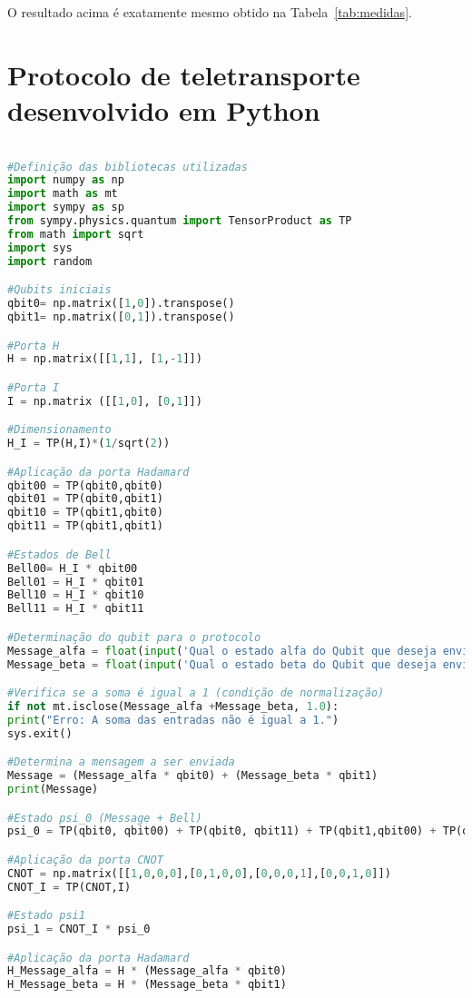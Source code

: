 O resultado acima é exatamente mesmo obtido na Tabela~\ref{tab:medidas}.

\clearpage

\chapter{Protocolo de teletransporte desenvolvido em Python}
\begin{lstlisting}[language=Python, caption=Protocolo de Teletransporte]

#Definição das bibliotecas utilizadas
import numpy as np
import math as mt
import sympy as sp
from sympy.physics.quantum import TensorProduct as TP
from math import sqrt
import sys
import random

#Qubits iniciais
qbit0= np.matrix([1,0]).transpose()
qbit1= np.matrix([0,1]).transpose()

#Porta H
H = np.matrix([[1,1], [1,-1]])

#Porta I
I = np.matrix ([[1,0], [0,1]])

#Dimensionamento
H_I = TP(H,I)*(1/sqrt(2))

#Aplicação da porta Hadamard
qbit00 = TP(qbit0,qbit0)
qbit01 = TP(qbit0,qbit1)
qbit10 = TP(qbit1,qbit0)
qbit11 = TP(qbit1,qbit1)

#Estados de Bell
Bell00= H_I * qbit00
Bell01 = H_I * qbit01
Bell10 = H_I * qbit10
Bell11 = H_I * qbit11

#Determinação do qubit para o protocolo
Message_alfa = float(input('Qual o estado alfa do Qubit que deseja enviar?'))
Message_beta = float(input('Qual o estado beta do Qubit que deseja enviar?'))

#Verifica se a soma é igual a 1 (condição de normalização)
if not mt.isclose(Message_alfa +Message_beta, 1.0):
print("Erro: A soma das entradas não é igual a 1.")
sys.exit()

#Determina a mensagem a ser enviada
Message = (Message_alfa * qbit0) + (Message_beta * qbit1)
print(Message)

#Estado psi_0 (Message + Bell)
psi_0 = TP(qbit0, qbit00) + TP(qbit0, qbit11) + TP(qbit1,qbit00) + TP(qbit1,qbit11)

#Aplicação da porta CNOT
CNOT = np.matrix([[1,0,0,0],[0,1,0,0],[0,0,0,1],[0,0,1,0]])
CNOT_I = TP(CNOT,I)

#Estado psi1
psi_1 = CNOT_I * psi_0

#Aplicação da porta Hadamard
H_Message_alfa = H * (Message_alfa * qbit0)
H_Message_beta = H * (Message_beta * qbit1)


\end{lstlisting}
